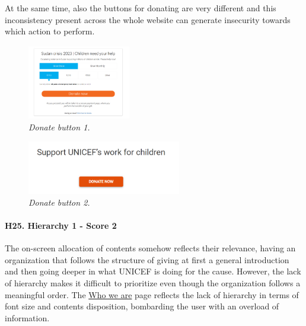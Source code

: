\newpage

At the same time, also the buttons for donating are very different and this inconsistency present across the whole website can generate insecurity towards which action to perform. 

\begin{figure}[h]
	\centering
	\begin{center}
		\includegraphics[width=0.4\textwidth]{Picture29.png}
	\end{center}
	\captionsetup{font=small}
	\caption{\textit{Donate button 1.}}
	\label{fig:label23}
\end{figure}

\begin{figure}[h]
	\centering
	\begin{center}
		\includegraphics[width=0.6\textwidth]{Picture29B.png}
	\end{center}
	\captionsetup{font=small}
	\caption{\textit{Donate button 2.}}
	\label{fig:label23}
\end{figure}

\newpage

\paragraph*{H25. Hierarchy 1  - Score 2}
The on-screen allocation of contents somehow reflects their relevance, having an organization that follows the structure of giving at first a general introduction and then going deeper in what UNICEF is doing for the cause. However, the lack of hierarchy makes it difficult to prioritize even though the organization follows a meaningful order.
The \href{https://www.unicef.org/about-unicef}{Who we are} page reflects the lack of hierarchy in terms of font size and contents disposition, bombarding the user with an overload of information.

